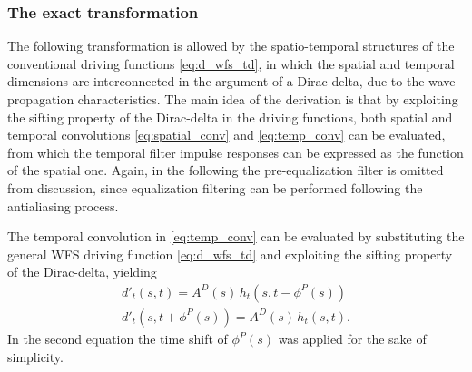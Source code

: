 \documentclass[conference]{IEEEtran}
\begin{document}
\subsubsection{The exact transformation}
The following transformation is allowed by the spatio-temporal structures of the conventional driving functions \eqref{eq:d_wfs_td}, in which the spatial and temporal dimensions are interconnected in the argument of a Dirac-delta, due to the wave propagation characteristics.
The main idea of the derivation is that by exploiting the sifting property of the Dirac-delta in the driving functions, both spatial and temporal convolutions \eqref{eq:spatial_conv} and \eqref{eq:temp_conv} can be evaluated, from which the temporal filter impulse responses can be expressed as the function of the spatial one.
Again, in the following the pre-equalization filter is omitted from discussion, since equalization filtering can be performed following the antialiasing process.

The temporal convolution in \eqref{eq:temp_conv} can be evaluated by substituting the general WFS driving function \eqref{eq:d_wfs_td} and exploiting the sifting property of the Dirac-delta, yielding
\begin{align}
    d'_t(s,t) = A^D(s) \, h_t \!\left(s,t- \phi^P(s) \right) \\
    d'_t(s,t + \phi^P(s) ) = A^D(s) \, h_t \!\left(s,t\right).
    \label{eq:temp_conv_eval}
\end{align}
In the second equation the time shift of $\phi^P(s)$ was applied for the sake of simplicity.
\end{document}
